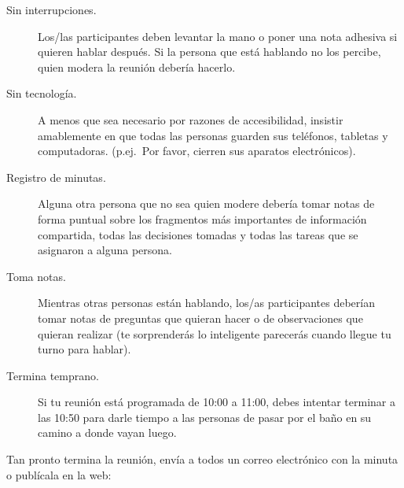 \begin{description}
\item[Sin interrupciones.]
  Los/las participantes deben levantar la mano o poner una nota adhesiva
  si quieren hablar después.
  Si la persona que está hablando no los percibe,
  quien modera la reunión debería hacerlo.

\item[Sin tecnología.]
  A menos que sea necesario por razones de accesibilidad,
  insistir amablemente en que todas las personas
  guarden sus teléfonos, tabletas y computadoras.
  (p.ej.\ Por favor, cierren sus aparatos electrónicos).

\item[Registro de minutas.]
  Alguna otra persona que no sea quien modere 
  debería tomar notas de forma puntual sobre 
  los fragmentos más importantes de información compartida,
  todas las decisiones tomadas
  y todas las tareas que se asignaron a alguna persona.

\item[Toma notas.]
  Mientras otras personas están hablando,
  los/as participantes deberían tomar notas de preguntas 
  que quieran hacer o de observaciones que quieran realizar
  (te sorprenderás lo inteligente parecerás 
  cuando llegue tu turno para hablar).

\item[Termina temprano.]
  Si tu reunión está programada de 10:00 a 11:00,
  debes intentar terminar a las 10:50 para darle tiempo 
  a las personas de pasar por el baño 
  en su camino a donde vayan luego.

\end{description}

Tan pronto termina la reunión,
envía a todos un correo electrónico con la minuta o publícala en la web:

